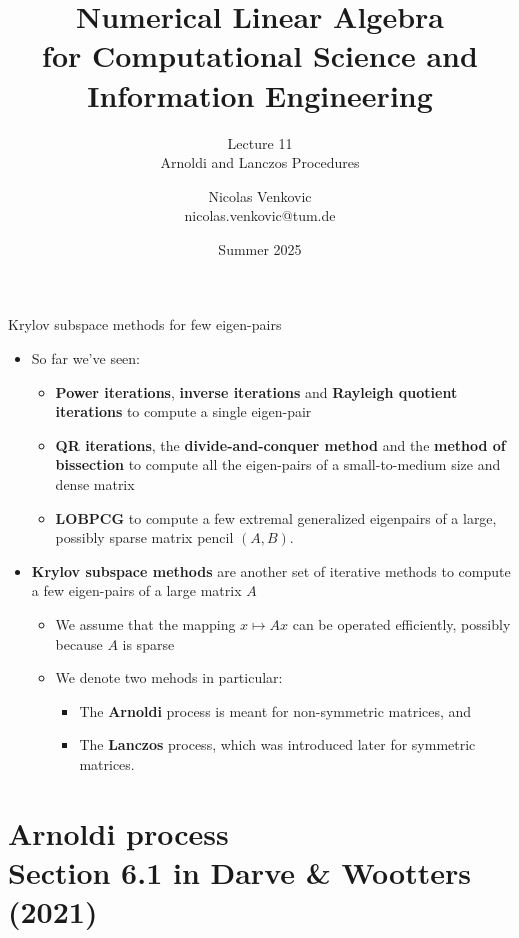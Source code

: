 \documentclass[t,usepdftitle=false]{beamer}
\title[NLA for CS and IE -- Lecture 11]{Numerical Linear Algebra\\for Computational Science and Information Engineering}
\subtitle{\vspace{.3cm}Lecture 11\\Arnoldi and Lanczos Procedures}
\date[Summer 2025]{Summer 2025}
\author[nicolas.venkovic@tum.de]{Nicolas Venkovic\\{\small nicolas.venkovic@tum.de}}
\institute[]{Group of Computational Mathematics\\School of Computation, Information and Technology\\Technical University of Munich}
\begin{document}
	
\begin{frame}
	\maketitle
\end{frame}
	
\myoutlineframe
	
\begin{frame}{Krylov subspace methods for few eigen-pairs}
\begin{itemize}
\item So far we've seen:
\begin{itemize}\normalsize
\item \textbf{Power iterations}, \textbf{inverse iterations} and \textbf{Rayleigh quotient iterations} to compute a single eigen-pair
\item \textbf{QR iterations}, the \textbf{divide-and-conquer method} and the \textbf{method of bissection} to compute all the eigen-pairs of a small-to-medium size and dense matrix
\item \textbf{LOBPCG} to compute a few extremal generalized eigenpairs of a large, possibly sparse matrix pencil $(A,B)$.
\end{itemize}
\item \textbf{Krylov subspace methods} are another set of iterative methods to compute a few eigen-pairs of a large matrix $A$
\begin{itemize}\normalsize
\item We assume that the mapping $x\mapsto Ax$ can be operated efficiently, possibly because $A$ is sparse\vspace{.1cm}
\item We denote two mehods in particular:
\begin{itemize}\normalsize
\item[-] The \textbf{Arnoldi} process is meant for non-symmetric matrices, and\vspace{.1cm}
\item[-] The \textbf{Lanczos} process, which was introduced later for symmetric matrices.
\end{itemize}
\end{itemize}
\end{itemize}
\end{frame}
		
	
\section{Arnoldi process\\{\small Section 6.1 in Darve \& Wootters (2021)}}
\end{document}

